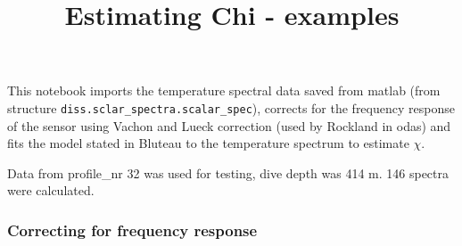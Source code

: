 \documentclass[]{article}
\title{Estimating Chi - examples}
\author{}
\date{}
\begin{document}
\maketitle

This notebook imports the temperature spectral data saved from matlab
(from structure \texttt{diss.sclar\_spectra.scalar\_spec}), corrects for
the frequency response of the sensor using Vachon and Lueck correction
(used by Rockland in odas) and fits the model stated in Bluteau to the
temperature spectrum to estimate \(\chi\).

Data from profile\_nr 32 was used for testing, dive depth was 414 m. 146
spectra were calculated.

\subsubsection{Correcting for frequency
response}\label{correcting-for-frequency-response}
\end{document}
